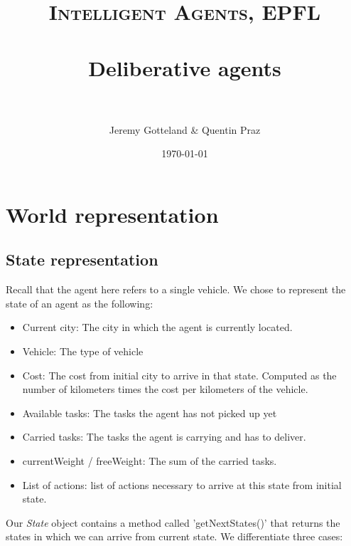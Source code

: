 \documentclass[fontsize=12pt]{scrartcl} %
\title{	
\normalfont \normalsize 
\textsc{Intelligent Agents, EPFL} \\ [20pt] %
\horrule{0.5pt} \\[0.4cm] %
\huge Deliberative	 agents \\ %
\horrule{2pt} \\[0.5cm] %
}
\author{Jeremy Gotteland \& Quentin Praz} %
\date{\normalsize\today} %
\begin{document}
\maketitle %


\section*{World representation}
\subsection*{State representation}
Recall that the agent here refers to a single vehicle.
We chose to represent the state of an agent as the following:
\begin{itemize}
\item Current city: The city in which the agent is currently located.

\item Vehicle: The type of vehicle

\item Cost: The cost from initial city to arrive in that state. Computed as the number of kilometers times the cost per kilometers of the vehicle.

\item Available tasks: The tasks the agent has not picked up yet  

\item Carried tasks: The tasks the agent is carrying and has to deliver.

\item currentWeight / freeWeight: The sum of the carried tasks.

\item List of actions: list of actions necessary to arrive at this state from initial state.
\end{itemize}

Our \textit{State} object contains a method called 'getNextStates()' that returns the states in which we can arrive from current state. We differentiate three cases:
\end{document}
